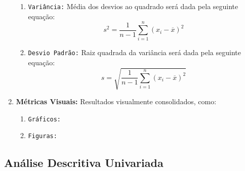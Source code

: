\documentclass{article}
\begin{document}
\begin{enumerate}[noitemsep]
\begin{enumerate}[noitemsep]
                            \item \texttt{Variância:} Média dos desvios ao quadrado será dada pela seguinte equação:
                                \begin{equation}
                                    \boxed{
                                        s^{2} = \frac{1}{n-1} \sum_{i=1}^{n} (x_{i} - \overline{x})^{2}
                                    }
                                \end{equation}
                            \item \texttt{Desvio Padrão:} Raiz quadrada da variância será dada pela seguinte equação:
                                \begin{equation}
                                    \boxed{
                                        s = \sqrt{\frac{1}{n-1} \sum_{i=1}^{n} (x_{i} - \overline{x})^{2}}
                                    }
                                \end{equation}
                        \end{enumerate}
                    \item \textbf{Métricas Visuais:} Resultados visualmente consolidados, como:
                        \begin{enumerate}[noitemsep]
                            \item \texttt{Gráficos:} 
                            \item \texttt{Figuras:} 
                        \end{enumerate}
                \end{enumerate}

        \subsection{Análise Descritiva Univariada}
\end{document}
